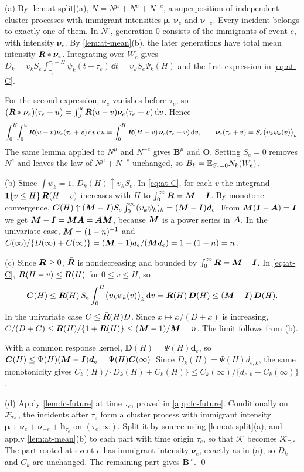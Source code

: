(a) By \cref{lem:at-split}(a), $N=N^{\mu}+N^{e}+N^{-e}$, a superposition of independent
cluster processes with immigrant intensities $\bm\mu$, $\bm\nu_e$ and $\bm\nu_{-e}$.
Every incident belongs to exactly one of them. In $N^e$, generation $0$ consists of the
immigrants of event $e$, with intensity $\bm\nu_e$. By \cref{lem:at-mean}(b), the
later generations have total mean intensity $\bm{R}*\bm\nu_e$. Integrating over $W_e$
gives
$D_k=\upsilon_kS_e\int_{\tau_e}^{\tau_e+H}\psi_k(t-\tau_e)\,\dd t=\upsilon_kS_e\Psi_k(H)$ and
the first expression in \eqref{eq:at-C}.

For the second expression, $\bm\nu_e$ vanishes before $\tau_e$, so
$(\bm{R}*\bm\nu_e)(\tau_e+u)=\int_0^u\bm{R}(u-v)\bm\nu_e(\tau_e+v)\,\mathrm{d} v$. Hence
\[
\int_0^H\!\!\int_0^u\bm{R}(u-v)\bm\nu_e(\tau_e+v)\,\mathrm{d} v\,\mathrm{d} u
=\int_0^H\bar{\bm{R}}(H-v)\,\bm\nu_e(\tau_e+v)\,\mathrm{d} v ,
\qquad \bm\nu_e(\tau_e+v)=S_e\bigl(\upsilon_k\psi_k(v)\bigr)_k .
\]
The same lemma applied to $N^\mu$ and $N^{-e}$ gives $\bm B^\mu$ and $\bm O$. Setting
$S_e=0$ removes $N^e$ and leaves the law of $N^\mu+N^{-e}$ unchanged, so
$B_k=\mathbb{E}_{S_e=0}N_k(W_e)$.

(b) Since $\int\psi_k=1$, $D_k(H)\uparrow\upsilon_kS_e$. In \eqref{eq:at-C}, for each $v$
the integrand $\mathbf{1}\!\left\{v\le H\right\}\bar{\bm{R}}(H-v)$ increases with $H$ to
$\int_0^\infty\bm{R}=\bm{M}-\bm{I}$. By monotone convergence,
$\bm C(H)\uparrow(\bm{M}-\bm{I})S_e\int_0^\infty(\upsilon_k\psi_k)_k=(\bm{M}-\bm{I})\bm d_e$.
From $\bm{M}(\bm{I}-\bm{A})=\bm{I}$ we get $\bm{M}-\bm{I}=\bm{M}\bm{A}=\bm{A}\bm{M}$, because $\bm{M}$
is a power series in $\bm{A}$. In the univariate case, $\bm{M}=(1-n)^{-1}$ and
$C(\infty)/\{D(\infty)+C(\infty)\}=(\bm{M}-1)d_e/(\bm{M} d_e)=1-(1-n)=n$.

(c) Since $\bm{R}\ge0$, $\bar{\bm{R}}$ is nondecreasing and bounded by
$\int_0^\infty\bm{R}=\bm{M}-\bm{I}$. In \eqref{eq:at-C}, $\bar{\bm{R}}(H-v)\le\bar{\bm{R}}(H)$
for $0\le v\le H$, so
\[
\bm C(H)\le\bar{\bm{R}}(H)\,S_e\int_0^H\bigl(\upsilon_k\psi_k(v)\bigr)_k\,\mathrm{d} v
=\bar{\bm{R}}(H)\,\bm D(H)\le(\bm{M}-\bm{I})\,\bm D(H).
\]
In the univariate case $C\le\bar{\bm{R}}(H)D$. Since $x\mapsto x/(D+x)$ is increasing,
$C/(D+C)\le\bar{\bm{R}}(H)/\{1+\bar{\bm{R}}(H)\}\le(\bm{M}-1)/\bm{M}=n$. The limit follows
from (b).

With a common response kernel, $\bm D(H)=\Psi(H)\bm d_e$, so
$\bm C(H)\le\Psi(H)(\bm{M}-\bm{I})\bm d_e=\Psi(H)\bm C(\infty)$. Since
$D_k(H)=\Psi(H)d_{e,k}$, the same monotonicity gives
$C_k(H)/\{D_k(H)+C_k(H)\}\le C_k(\infty)/\{d_{e,k}+C_k(\infty)\}$.

(d) Apply \cref{lem:fc-future} at time $\tau_e$, proved in \cref{app:fc-future}.
Conditionally on $\mathcal{F}_{\tau_e}$, the incidents after $\tau_e$ form a cluster process
with immigrant intensity $\bm\mu+\bm\nu_e+\bm\nu_{-e}+\bm h_{\tau_e}$ on
$(\tau_e,\infty)$. Split it by source using \cref{lem:at-split}(a), and apply
\cref{lem:at-mean}(b) to each part with time origin $\tau_e$, so that $\mathcal K$
becomes $\mathcal K_{\tau_e}$. The part rooted at event $e$ has immigrant intensity
$\bm\nu_e$, exactly as in (a), so $D_k$ and $C_k$ are unchanged. The remaining part gives
$\bm B^{\mid e}$. \qed

